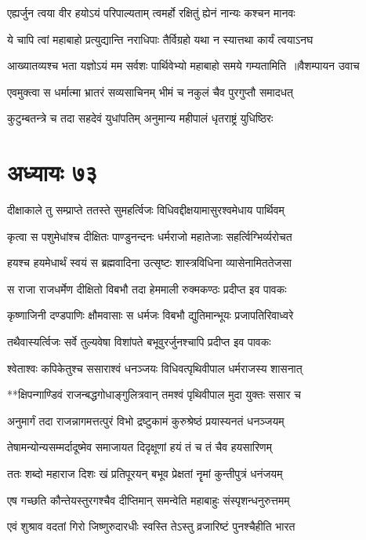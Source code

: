 \twolineshloka
{एह्यर्जुन त्वया वीर हयोऽयं परिपाल्यताम्}
{त्वमर्हो रक्षितुं ह्येनं नान्यः कश्चन मानवः}


\twolineshloka
{ये चापि त्वां महाबाहो प्रत्युद्यान्ति नराधिपाः}
{तैर्विग्रहो यथा न स्यात्तथा कार्यं त्वयाऽनघ}


\threelineshloka
{आख्यातव्यश्च भता यज्ञोऽयं मम सर्वशः}
{पार्थिवेभ्यो महाबाहो समये गम्यतामिति ॥वैशम्पायन उवाच}
{}


\twolineshloka
{एवमुक्त्वा स धर्मात्मा भ्रातरं सव्यसाचिनम्}
{भीमं च नकुलं चैव पुरगुप्तौ समादधत्}


\twolineshloka
{कुटुम्बतन्त्रे च तदा सहदेवं युधांपतिम्}
{अनुमान्य महीपालं धृतराष्ट्रं युधिष्ठिरः}


\chapter{अध्यायः ७३}
\twolineshloka
{दीक्षाकाले तु सम्प्राप्ते ततस्ते सुमहर्त्विजः}
{विधिवद्दीक्षयामासुरश्वमेधाय पार्थिवम्}


\twolineshloka
{कृत्वा स पशुमेधांश्च दीक्षितः पाण्डुनन्दनः}
{धर्मराजो महातेजाः सहर्त्विग्भिर्व्यरोचत}


\twolineshloka
{हयश्च हयमेधार्थं स्वयं स ब्रह्मवादिना}
{उत्सृष्टः शास्त्रविधिना व्यासेनामिततेजसा}


\twolineshloka
{स राजा राजधर्मेण दीक्षितो विबभौ तदा}
{हेममाली रुक्मकण्ठः प्रदीप्त इव पावकः}


\twolineshloka
{कृष्णाजिनी दण्डपाणिः क्षौमवासाः स धर्मजः}
{विबभौ द्युतिमान्भूयः प्रजापतिरिवाध्वरे}


\twolineshloka
{तथैवास्यर्त्विजः सर्वे तुल्यवेषा विशांपते}
{बभूवुरर्जुनश्चापि प्रदीप्त इव पावकः}


\twolineshloka
{श्वेताश्वः कपिकेतुश्च ससाराश्वं धनञ्जयः}
{विधिवत्पृथिवीपाल धर्मराजस्य शासनात्}


\twolineshloka
{**क्षिपन्गाण्डिवं राजन्बद्धगोधाङ्गुलित्रवान्}
{तमश्वं पृथिवीपाल मुदा युक्तः ससार च}


\twolineshloka
{अनुमार्गं तदा राजन्नागमत्तत्पुरं विभो}
{द्रष्टुकामं कुरुश्रेष्ठं प्रयास्यनतं धनञ्जयम्}


\twolineshloka
{तेषामन्योन्यसम्मर्दादूष्मेव समाजायत}
{दिदृक्षूणां हयं तं च तं चैव हयसारिणम्}


\twolineshloka
{ततः शब्दो महाराज दिशः खं प्रतिपूरयन्}
{बभूव प्रेक्षतां नॄमां कुन्तीपुत्रं धनंजयम्}


\twolineshloka
{एष गच्छति कौन्तेयस्तुरगश्चैव दीप्तिमान्}
{समन्वेति महाबाहुः संस्पृशन्धनुरुत्तमम्}


\twolineshloka
{एवं शुश्राव वदतां गिरो जिष्णुरुदारधीः}
{स्वस्ति तेऽस्तु व्रजारिष्टं पुनश्चैहीति भारत}


